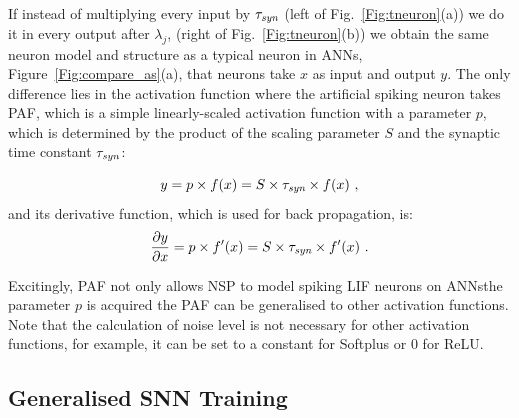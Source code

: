 	
	If instead of multiplying every input by $\tau_{\textit{\textrm{syn}}}$ (left of Fig.~\ref{Fig:tneuron}(a)) we do it in every output after $\lambda_j$, (right of Fig.~\ref{Fig:tneuron}(b)) we obtain the same neuron model and structure as a typical neuron in ANNs, \DIFdelbegin {}\DIFdelend \DIFaddbegin {}\DIFaddend Figure~\ref{Fig:compare_as}(a), that neurons take $x$ as input and output $y$.
	The only difference lies in the activation function where the artificial spiking neuron takes PAF, which is a simple linearly-scaled activation function with a parameter $p$, which is determined by the product of the scaling parameter $S$ and the synaptic time constant $\tau_{\textit{\textrm{syn}}}$:

	\begin{equation}
	y = p \times f(x) = S \times \tau_{\textit{\textrm{syn}}} \times f(x)~,
	\label{equ:PAF}
	\end{equation}
	and its derivative function, which is used for back propagation, is:
	\begin{equation}
	\frac{\partial y}{\partial x} = p \times f'(x) = S \times \tau_{\textit{\textrm{syn}}} \times f'(x)~.
	\end{equation}

	Excitingly, PAF not only allows NSP to model spiking LIF neurons on ANNs\DIFdelbegin {}\DIFdelend \DIFaddbegin {}\DIFaddend the parameter $p$ is acquired the PAF can be generalised to other activation functions.
	Note that the calculation of noise level is not necessary for other activation functions, for example, it can be set to a constant for Softplus or 0 for ReLU.
	\subsection{Generalised SNN Training}
	\label{subsec:ns_train}

